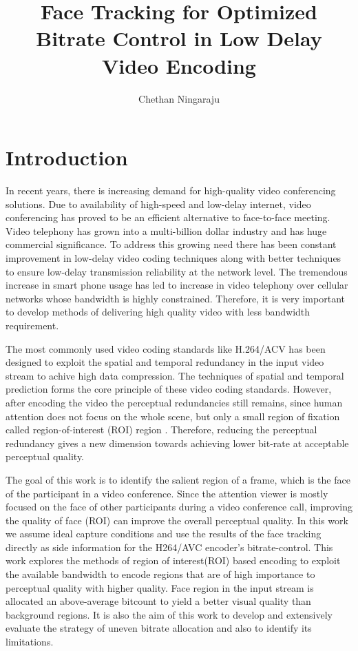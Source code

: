 \documentclass[11pt]{article} %
\title{Face Tracking for Optimized Bitrate Control in Low Delay Video Encoding}
\author{Chethan Ningaraju}
\begin{document}
\maketitle
\clearpage
\tableofcontents
\clearpage
\section{Introduction}
	In recent years, there is increasing demand for high-quality video conferencing solutions. Due to availability of high-speed and low-delay internet, video conferencing has proved to be an efficient alternative to face-to-face meeting. Video telephony has grown into a multi-billion dollar industry and has huge commercial significance. To address this growing need there has been constant improvement in  low-delay video coding techniques along with better techniques to ensure low-delay transmission reliability at the network level. The tremendous increase in smart phone usage has led to increase in video telephony over cellular networks whose bandwidth is highly constrained. Therefore, it is very important to develop methods of delivering high quality video with less bandwidth requirement. 

The most commonly used video coding standards like H.264/ACV has been designed to exploit the spatial and temporal redundancy in the input video stream to achive high data compression. The techniques of spatial and temporal prediction forms the core principle of these video coding standards. However, after encoding the video the perceptual redundancies still remains, since human attention does not focus on the whole scene, but only a small region of fixation called region-of-interest (ROI) region \cite{Perception-model-of-face}. Therefore, reducing the perceptual redundancy gives a new dimension towards achieving lower bit-rate at acceptable perceptual quality.

The goal of this work is to identify the salient region of a frame, which is the face of the participant in a video conference. Since the attention viewer is mostly focused on the face of other participants during a video conference call, improving the quality of face (ROI) can improve the overall perceptual quality. In this work we assume ideal capture conditions and use the results of the face tracking directly as side information for the H264/AVC encoder's bitrate-control. This work explores the methods of region of interest(ROI) based encoding to exploit the available bandwidth to encode regions that are of high importance to perceptual quality with higher quality. Face region in the input stream is allocated an above-average bitcount to yield a better visual quality than background regions. It is also the aim of this work to develop and extensively evaluate the strategy of uneven bitrate allocation and also to identify its limitations.
\end{document}
